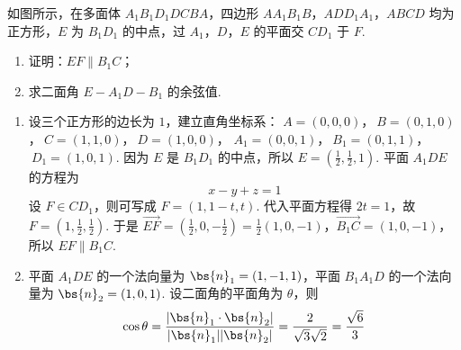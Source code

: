 \begin{problem}
如图所示，在多面体 \(A_{1}B_{1}D_{1}DCBA\)，四边形 \(AA_{1}B_{1}B\)，\(ADD_{1}A_{1}\)，\(ABCD\) 均为正方形，\(E\) 为 \(B_{1}D_{1}\) 的中点，过 \(A_{1}\)，\(D\)，\(E\) 的平面交 \(CD_{1}\) 于 \(F\).

\begin{enumerate}
\item 证明：\(EF \parallel B_{1}C\)；
\item 求二面角 \(E - A_{1}D - B_{1}\) 的余弦值.
\end{enumerate}

\begin{solution}
\begin{enumerate}
\item
设三个正方形的边长为 \(1\)，建立直角坐标系：
\(A=(0,0,0)\)，\(\ B=(0,1,0)\)，\(\ C=(1,1,0)\)，\(\ D=(1,0,0)\)，
\(A_1=(0,0,1)\)，\(\ B_1=(0,1,1)\)，\(\ D_1=(1,0,1)\).
因为 \(E\) 是 \(B_1D_1\) 的中点，所以 \(E=(\frac12,\frac12,1)\). 平面 \(A_1DE\) 的方程为
\[
x-y+z=1
\]
设 \(F\in CD_1\)，则可写成 \(F=(1,1-t,t)\). 代入平面方程得 \(2t=1\)，故
\(F=(1,\frac12,\frac12)\). 于是
\(\overrightarrow{EF}=\left(\frac12,0,-\frac12\right)=\frac12(1,0,-1)\)，\(\overrightarrow{B_1C}=(1,0,-1)\)，
所以 \(EF\parallel B_1C\).

\item
平面 \(A_1DE\) 的一个法向量为 \(\bs{n}_1=(1,-1,1)\)，平面 \(B_1A_1D\) 的一个法向量为 \(\bs{n}_2=(1,0,1)\). 设二面角的平面角为 \(\theta\)，则
\[
\cos\theta=\frac{|\bs{n}_1\cdot\bs{n}_2|}{|\bs{n}_1||\bs{n}_2|}
=\frac{2}{\sqrt3\sqrt2}=\frac{\sqrt6}{3}
\]
\end{enumerate}
\end{solution}
\end{problem}

